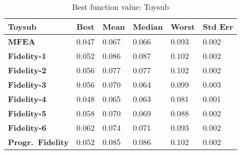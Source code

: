 \begin{table}[!ht]\footnotesize
	\centering
	\caption{Best function value: Toysub}
	\label{tab:toysubBest}
	\begin{tabular}{l|l|l|l|l|l}
		\hline
		\textbf{Toysub}               & \textbf{Best} & \textbf{Mean} & \textbf{Median} & \textbf{Worst} & \textbf{Std Err} \\ \hline
		\textbf{MFEA}           & 0.047         & 0.067         & 0.066           & 0.093          & 0.002              \\ 
		\textbf{Fidelity-1}           & 0.052         & 0.086         & 0.087           & 0.102          & 0.002              \\ 
		\textbf{Fidelity-2}           & 0.056         & 0.077         & 0.077           & 0.102          & 0.002              \\ 
		\textbf{Fidelity-3}           & 0.056         & 0.070         & 0.064           & 0.099          & 0.003              \\ 
		\textbf{Fidelity-4}           & 0.048         & 0.065         & 0.063           & 0.081          & 0.001              \\ 
		\textbf{Fidelity-5}           & 0.058         & 0.070         & 0.069           & 0.088          & 0.002              \\ 
		\textbf{Fidelity-6}           & 0.062         & 0.074         & 0.071           & 0.093          & 0.002              \\ 
		\textbf{Progr.\ Fidelity} & 0.052         & 0.085         & 0.086           & 0.102          & 0.002              \\ \hline
	\end{tabular}
\end{table}

